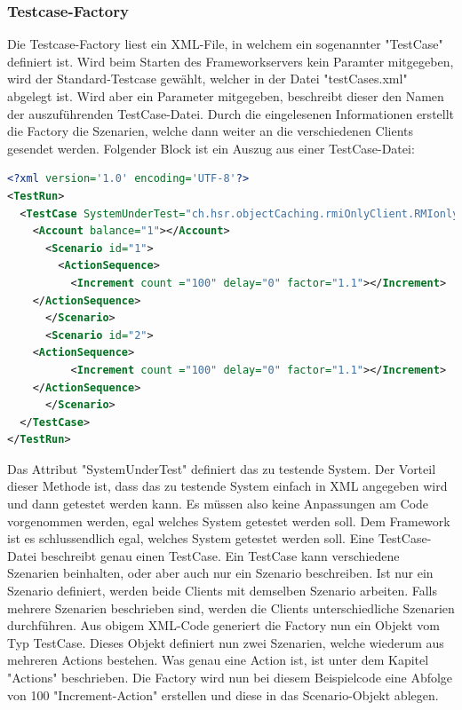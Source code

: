 \subsubsection{Testcase-Factory}
\label{sec:testCaseFactory}
Die Testcase-Factory liest ein XML-File, in welchem ein sogenannter "TestCase" definiert ist. Wird beim Starten des Frameworkservers kein Paramter mitgegeben, wird der Standard-Testcase gewählt, welcher in der Datei "testCases.xml" abgelegt ist. Wird aber ein Parameter mitgegeben, beschreibt dieser den Namen der auszuführenden TestCase-Datei.\newline
Durch die eingelesenen Informationen erstellt die Factory die Szenarien, welche dann weiter an die verschiedenen Clients gesendet werden. Folgender Block ist ein Auszug aus einer TestCase-Datei:

\begin{lstlisting}[language=XML, breaklines=true] 	
<?xml version='1.0' encoding='UTF-8'?>
<TestRun>
  <TestCase SystemUnderTest="ch.hsr.objectCaching.rmiOnlyClient.RMIonlyClientSystem">
    <Account balance="1"></Account>
      <Scenario id="1">
        <ActionSequence>
          <Increment count ="100" delay="0" factor="1.1"></Increment>
	</ActionSequence>
      </Scenario>
      <Scenario id="2">
	<ActionSequence>
          <Increment count ="100" delay="0" factor="1.1"></Increment>
	</ActionSequence>
      </Scenario>
  </TestCase>
</TestRun>
\end{lstlisting}

Das Attribut "SystemUnderTest" definiert das zu testende System. Der Vorteil dieser Methode ist, dass das zu testende System einfach in XML angegeben wird und dann getestet werden kann. Es müssen also keine Anpassungen am Code vorgenommen werden, egal welches System getestet werden soll. Dem Framework ist es schlussendlich egal, welches System getestet werden soll.\newline
Eine TestCase-Datei beschreibt genau einen TestCase. Ein TestCase kann verschiedene Szenarien beinhalten, oder aber auch nur ein Szenario beschreiben. Ist nur ein Szenario definiert, werden beide Clients mit demselben Szenario arbeiten. Falls mehrere Szenarien beschrieben sind, werden die Clients unterschiedliche Szenarien durchführen. \newline
Aus obigem XML-Code generiert die Factory nun ein Objekt vom Typ TestCase. Dieses Objekt definiert nun zwei Szenarien, welche wiederum aus mehreren Actions bestehen. Was genau eine Action ist, ist unter dem Kapitel "Actions" beschrieben. Die Factory wird nun bei diesem Beispielcode eine Abfolge von 100 "Increment-Action" erstellen und diese in das Scenario-Objekt ablegen.


